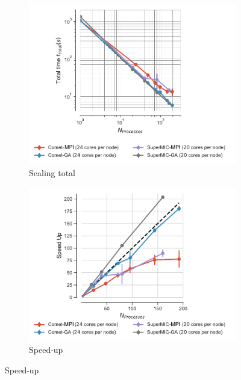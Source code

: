 \begin{figure}[!htb]
  \centering
  \begin{subfigure}{.49\textwidth}
    \includegraphics[width=\linewidth]{figures/Comparison_t-tot-clusters_Splitting_edited.pdf}
    \caption{Scaling total}
    \label{fig:MPIscaling-clusters-splitting}
  \end{subfigure}
  \hfill
  \begin{subfigure}{.49\textwidth}
    \includegraphics[width=\linewidth]{figures/Comparison_speed-up-clusters_Splitting_edited.pdf}
    \caption{Speed-up}
    \label{fig:MPIspeedup-clusters-splitting}
  \end{subfigure}
  \bigskip


\end{figure}
